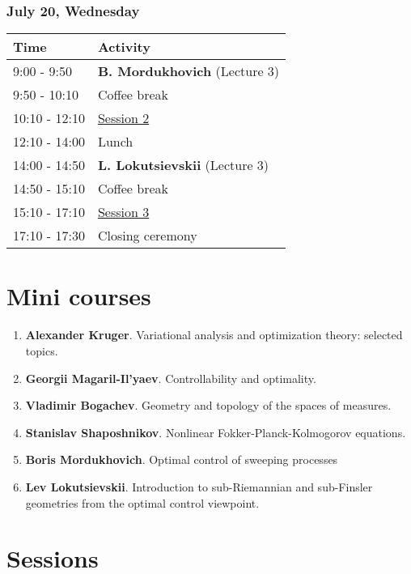 \documentclass[
]{article}
\providecommand{\tightlist}{%
  \setlength{\itemsep}{0pt}\setlength{\parskip}{0pt}}
\begin{document}
\hypertarget{july-20-wednesday}{%
\subsubsection{July 20, Wednesday}\label{july-20-wednesday}}

\begin{longtable}[]{@{}ll@{}}
\toprule()
Time & Activity \\
\midrule()
\endhead
9:00 - 9:50 & \textbf{B. Mordukhovich} (Lecture 3) \\
9:50 - 10:10 & Coffee break \\
10:10 - 12:10 & \protect\hyperlink{se}{Session 2} \\
12:10 - 14:00 & Lunch \\
14:00 - 14:50 & \textbf{L. Lokutsievskii} (Lecture 3) \\
14:50 - 15:10 & Coffee break \\
15:10 - 17:10 & \protect\hyperlink{se}{Session 3} \\
17:10 - 17:30 & Closing ceremony \\
\bottomrule()
\end{longtable}

\hypertarget{mini-courses}{%
\section{Mini courses}\label{mini-courses}}

\begin{enumerate}
\def\labelenumi{\arabic{enumi}.}
\tightlist
\item
  \textbf{Alexander Kruger}. Variational analysis and optimization
  theory: selected topics.
\item
  \textbf{Georgii Magaril-Il'yaev}. Controllability and optimality.
\item
  \textbf{Vladimir Bogachev}. Geometry and topology of the spaces of
  measures.
\item
  \textbf{Stanislav Shaposhnikov}. Nonlinear Fokker-Planck-Kolmogorov
  equations.
\item
  \textbf{Boris Mordukhovich}. Optimal control of sweeping processes
\item
  \textbf{Lev Lokutsievskii}. Introduction to sub-Riemannian and
  sub-Finsler geometries from the optimal control viewpoint. \newpage
\end{enumerate}

\hypertarget{se}{%
\section{Sessions}\label{se}}
\end{document}

